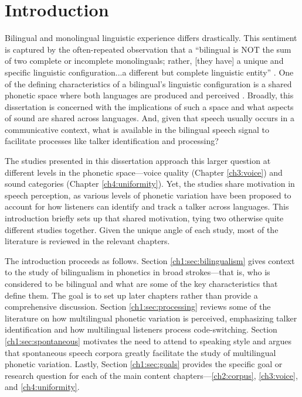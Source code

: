 
\chapter{Introduction}\label{ch1:intro}

Bilingual and monolingual linguistic experience differs drastically. This sentiment is captured by the often-repeated observation that a ``bilingual is NOT the sum of two complete or incomplete monolinguals; rather, [they have] a unique and specific linguistic configuration...a different but complete linguistic entity'' \citep[][p. 6]{grosjean_1989_bilingual}. One of the defining characteristics of a bilingual's linguistic configuration is a shared phonetic space where both languages are produced and perceived \citep{flege_2021_slmr}. Broadly, this dissertation is concerned with the implications of such a space and what aspects of sound are shared across languages. And, given that speech usually occurs in a communicative context, what is available in the bilingual speech signal to facilitate processes like talker identification and processing? 

The studies presented in this dissertation approach this larger question at different levels in the phonetic space---voice quality (Chapter \ref{ch3:voice}) and sound categories (Chapter \ref{ch4:uniformity}). Yet, the studies share motivation in speech perception, as various levels of phonetic variation have been proposed to account for how listeners can identify and track a talker across languages. This introduction briefly sets up that shared motivation, tying two otherwise quite different studies together. Given the unique angle of each study, most of the literature is reviewed in the relevant chapters. 

The introduction proceeds as follows. Section \ref{ch1:sec:bilingualism} gives context to the study of bilingualism in phonetics in broad strokes---that is, who is considered to be bilingual and what are some of the key characteristics that define them. The goal is to set up later chapters rather than provide a comprehensive discussion. Section \ref{ch1:sec:processing} reviews some of the literature on how multilingual phonetic variation is perceived, emphasizing talker identification and how multilingual listeners process code-switching. Section \ref{ch1:sec:spontaneous} motivates the need to attend to speaking style and argues that spontaneous speech corpora greatly facilitate the study of multilingual phonetic variation. Lastly, Section \ref{ch1:sec:goals} provides the specific goal or research question for each of the main content chapters---\ref{ch2:corpus}, \ref{ch3:voice}, and \ref{ch4:uniformity}.

